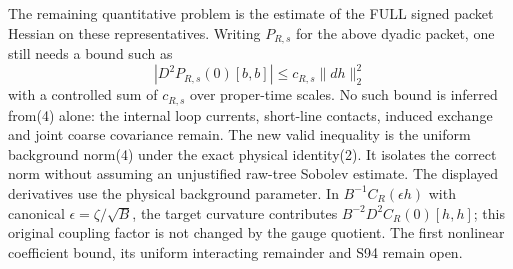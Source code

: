 \documentclass[11pt]{article}
\begin{document}
The remaining quantitative problem is the estimate of the FULL signed
packet Hessian on these representatives. Writing $P_{R,s}$ for the
above dyadic packet, one still needs a bound such as
\[
 |D^2P_{R,s}(0)[b,b]|\le c_{R,s}\|dh\|_2^2
\]
with a controlled sum of $c_{R,s}$ over proper-time scales.
No such bound is inferred from(4) alone: the internal loop currents,
short-line contacts, induced exchange and joint coarse covariance
remain. The new valid inequality is the uniform background norm(4)
under the exact physical identity(2). It isolates the correct norm
without assuming an unjustified raw-tree Sobolev estimate.
The displayed derivatives use the physical background parameter. In
$B^{-1}C_R(\epsilon h)$ with canonical $\epsilon=\zeta/\sqrt B$,
the target curvature contributes $B^{-2}D^2C_R(0)[h,h]$; this original
coupling factor is not changed by the gauge quotient.
The first nonlinear coefficient bound, its uniform interacting
remainder and S94 remain open.
\end{document}
